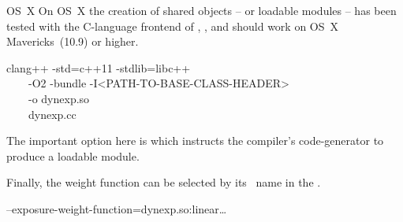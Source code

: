 \medskip

\begin{restrictedmaterial}{OS~X}
  \noindent On OS~X the creation of shared objects -- or loadable modules -- has been tested
  with the C-language frontend of ,
  , and should work on OS~X Mavericks~(10.9) or higher.

  \begin{literal}
    clang++ -std=c++11 -stdlib=libc++ \bslash \\
    ~~~~-O2 -bundle -I<PATH-TO-BASE-CLASS-HEADER> \bslash \\
    ~~~~-o dynexp.so \bslash \\
    ~~~~dynexp.cc
  \end{literal}

  The important option here is  which instructs the compiler's code-generator to
  produce a loadable module.

  Finally, the weight function can be selected by its ~name in the
  .

  \begin{literal}
    \app{} --exposure-weight-function=dynexp.so:linear\dots
  \end{literal}
\end{restrictedmaterial}

\medskip

